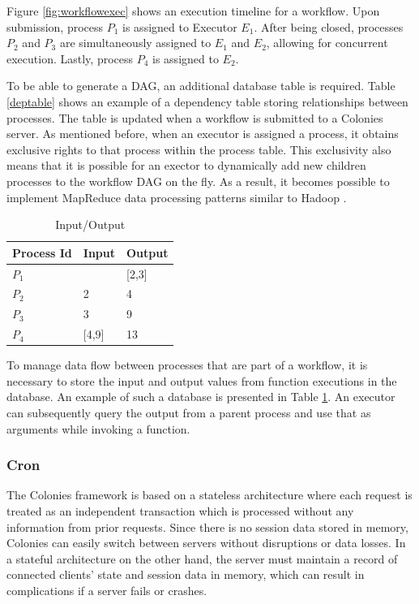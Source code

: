\documentclass{article}
\begin{document}
Figure \ref{fig:workflowexec} shows an execution timeline for a workflow. Upon submission, process \(P_{1}\) is assigned to Executor \(E_{1}\). After being closed, processes \(P_{2}\) and \(P_{3}\) are simultaneously assigned to \(E_{1}\) and \(E_{2}\), allowing for concurrent execution. Lastly, process \(P_{4}\) is assigned to \(E_{2}\).  

To be able to generate a DAG, an additional database table is required. Table \ref{deptable} shows an example of a dependency table storing relationships between processes. The table is updated when a workflow is submitted to a Colonies server. As mentioned before, when an executor is assigned a process, it obtains exclusive rights to that process within the process table. This exclusivity also means that it is possible for an exector to dynamically add new children processes to the workflow DAG on the fly. As a result, it becomes possible to implement MapReduce \cite{mapreduce} data processing patterns similar to Hadoop \cite{hadoop}.  

\begin{table}[h]
	\caption{Input/Output}
	\centering
	\begin{tabular}{lll}
		\toprule
		\cmidrule(r){1-2}
        Process Id & Input & Output \\
		\midrule
        $P_{1}$    & & [2,3] \\
        $P_{2}$    & 2 & 4 \\
        $P_{3}$    & 3 & 9 \\
        $P_{4}$    & [4,9] & 13 \\
		\bottomrule
	\end{tabular}
	\label{inouttable}
\end{table}

To manage data flow between processes that are part of a workflow, it is necessary to store the input and output values from function executions in the database. An example of such a database is presented in Table \ref{inouttable}. An executor can subsequently query the output from a parent process and use that as arguments while invoking a function.

\subsubsection{Cron}
The Colonies framework is based on a stateless architecture where each request is treated as an independent transaction which is processed without any information from prior requests. Since there is no session data stored in memory, Colonies can easily switch between servers without disruptions or data losses. In a stateful architecture on the other hand, the server must maintain a record of connected clients' state and session data in memory, which can result in complications if a server fails or crashes. 
\end{document}
